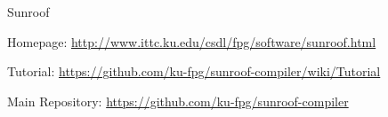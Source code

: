 \begin{hcarentry}[updated]{Sunroof}
\FurtherReading
\begin{compactitem}
\item Homepage: \url{http://www.ittc.ku.edu/csdl/fpg/software/sunroof.html}\\
\item Tutorial: \url{https://github.com/ku-fpg/sunroof-compiler/wiki/Tutorial}\\
\item Main Repository: \url{https://github.com/ku-fpg/sunroof-compiler}\\
\end{compactitem}
\end{hcarentry}
